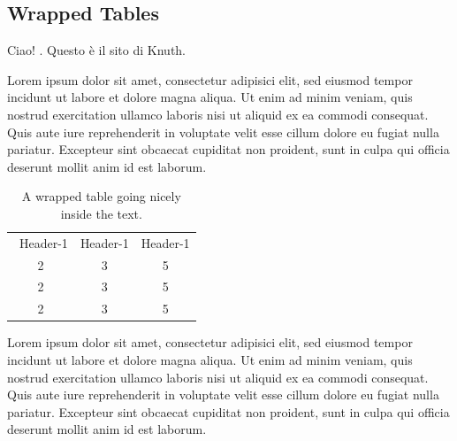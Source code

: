 \documentclass[../main.tex]{subfiles}
\begin{document}
\subsection{Wrapped Tables}

Ciao! \cite{knuthwebsite}. Questo è il sito di Knuth.

Lorem ipsum dolor sit amet, consectetur adipisici elit, sed eiusmod tempor incidunt ut labore et dolore magna aliqua. Ut enim ad minim veniam, quis nostrud exercitation ullamco laboris nisi ut aliquid ex ea commodi consequat. Quis aute iure reprehenderit in voluptate velit esse cillum dolore eu fugiat nulla pariatur. Excepteur sint obcaecat cupiditat non proident, sunt in culpa qui officia deserunt mollit anim id est laborum.
\begin{table}
\caption{A wrapped table going nicely inside the text.}\label{wrap-tab:1}
\begin{tabular}{ccc}\  
Header-1 & Header-1 & Header-1 \\
2 &3 & 5\\  
2 &3 & 5\\  
2 &3 & 5\\  
\end{tabular}
\end{table}
Lorem ipsum dolor sit amet, consectetur adipisici elit, sed eiusmod tempor incidunt ut labore et dolore magna aliqua. Ut enim ad minim veniam, quis nostrud exercitation ullamco laboris nisi ut aliquid ex ea commodi consequat. Quis aute iure reprehenderit in voluptate velit esse cillum dolore eu fugiat nulla pariatur. Excepteur sint obcaecat cupiditat non proident, sunt in culpa qui officia deserunt mollit anim id est laborum.
\end{document}
